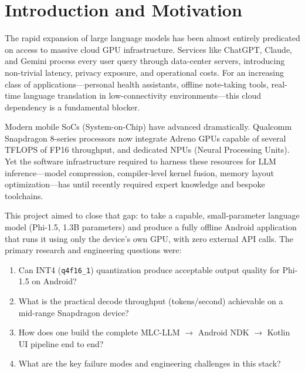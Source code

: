 \documentclass[12pt,letterpaper]{article}
\begin{document}
\tableofcontents
\clearpage

\section{Introduction and Motivation}

The rapid expansion of large language models has been almost entirely predicated
on access to massive cloud GPU infrastructure.
Services like ChatGPT, Claude, and Gemini process every user query through
data-center servers, introducing non-trivial latency, privacy exposure, and
operational costs.
For an increasing class of applications---personal health assistants,
offline note-taking tools, real-time language translation in
low-connectivity environments---this cloud dependency is a fundamental blocker.

Modern mobile SoCs (System-on-Chip) have advanced dramatically.
Qualcomm Snapdragon 8-series processors now integrate Adreno GPUs capable of
several TFLOPS of FP16 throughput, and dedicated NPUs (Neural Processing Units).
Yet the software infrastructure required to harness these resources for
LLM inference---model compression, compiler-level kernel fusion,
memory layout optimization---has until recently required expert knowledge and
bespoke toolchains.

This project aimed to close that gap: to take a capable, small-parameter language
model (Phi-1.5, 1.3B parameters) and produce a fully offline Android application
that runs it using only the device's own GPU, with zero external API calls.
The primary research and engineering questions were:

\begin{enumerate}[noitemsep]
    \item Can INT4 (\texttt{q4f16\_1}) quantization produce acceptable output quality
          for Phi-1.5 on Android?
    \item What is the practical decode throughput (tokens/second) achievable on
          a mid-range Snapdragon device?
    \item How does one build the complete MLC-LLM $\to$ Android NDK $\to$
          Kotlin UI pipeline end to end?
    \item What are the key failure modes and engineering challenges in this stack?
\end{enumerate}

\end{document}
